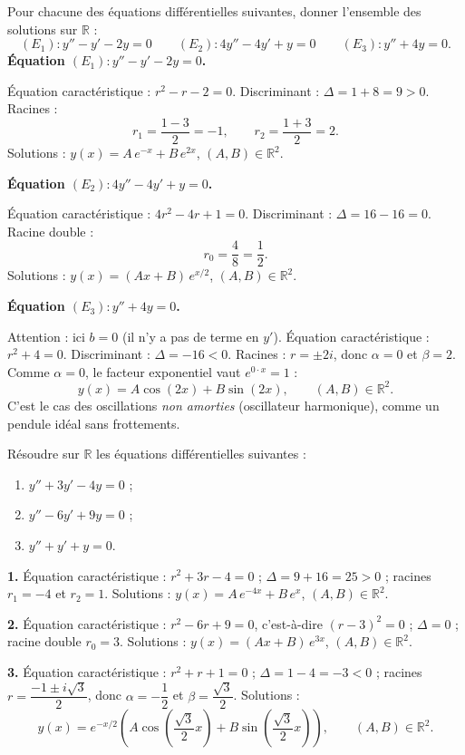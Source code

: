 \documentclass[11pt]{article}
\newcounter{popsec}
\newcounter{popsub}
\newcommand{\courssub}[1]{%
  \stepcounter{popsub}%
  \par\vspace{9pt}\noindent{\popxbold\fontsize{11.5}{13}\selectfont\color{popink}{\color{poporange}\thepopsec.\thepopsub}\hspace{6pt}#1}\par\nopagebreak\vspace{4pt}
}
\begin{document}
\courssub{Exercice résolu de synthèse}

\begin{exoresolu}
Pour chacune des équations différentielles suivantes, donner l'ensemble des solutions sur $\mathbb{R}$ :
\[ (E_1) : y'' - y' - 2y = 0 \qquad (E_2) : 4y'' - 4y' + y = 0 \qquad (E_3) : y'' + 4y = 0. \]
\tcblower
\textbf{Équation $(E_1) : y'' - y' - 2y = 0$.}

Équation caractéristique : $r^2 - r - 2 = 0$. Discriminant : $\Delta = 1 + 8 = 9 > 0$. Racines :
\[ r_1 = \frac{1 - 3}{2} = -1, \qquad r_2 = \frac{1 + 3}{2} = 2. \]
Solutions : $y(x) = A\,e^{-x} + B\,e^{2x}$, $(A,B) \in \mathbb{R}^2$.

\textbf{Équation $(E_2) : 4y'' - 4y' + y = 0$.}

Équation caractéristique : $4r^2 - 4r + 1 = 0$. Discriminant : $\Delta = 16 - 16 = 0$. Racine double :
\[ r_0 = \frac{4}{8} = \frac{1}{2}. \]
Solutions : $y(x) = (Ax + B)\,e^{x/2}$, $(A,B) \in \mathbb{R}^2$.

\textbf{Équation $(E_3) : y'' + 4y = 0$.}

Attention : ici $b = 0$ (il n'y a pas de terme en $y'$). Équation caractéristique : $r^2 + 4 = 0$. Discriminant : $\Delta = -16 < 0$. Racines : $r = \pm 2i$, donc $\alpha = 0$ et $\beta = 2$. Comme $\alpha = 0$, le facteur exponentiel vaut $e^{0 \cdot x} = 1$ :
\[ y(x) = A\cos(2x) + B\sin(2x), \qquad (A,B) \in \mathbb{R}^2. \]
C'est le cas des oscillations \emph{non amorties} (oscillateur harmonique), comme un pendule idéal sans frottements.
\end{exoresolu}

\begin{exercice}
Résoudre sur $\mathbb{R}$ les équations différentielles suivantes :
\begin{enumerate}
\item $y'' + 3y' - 4y = 0$ ;
\item $y'' - 6y' + 9y = 0$ ;
\item $y'' + y' + y = 0$.
\end{enumerate}
\end{exercice}

\begin{corrige}
\textbf{1.} Équation caractéristique : $r^2 + 3r - 4 = 0$ ; $\Delta = 9 + 16 = 25 > 0$ ; racines $r_1 = -4$ et $r_2 = 1$. Solutions : $y(x) = A\,e^{-4x} + B\,e^{x}$, $(A,B) \in \mathbb{R}^2$.

\textbf{2.} Équation caractéristique : $r^2 - 6r + 9 = 0$, c'est-à-dire $(r-3)^2 = 0$ ; $\Delta = 0$ ; racine double $r_0 = 3$. Solutions : $y(x) = (Ax + B)\,e^{3x}$, $(A,B) \in \mathbb{R}^2$.

\textbf{3.} Équation caractéristique : $r^2 + r + 1 = 0$ ; $\Delta = 1 - 4 = -3 < 0$ ; racines $r = \dfrac{-1 \pm i\sqrt{3}}{2}$, donc $\alpha = -\dfrac{1}{2}$ et $\beta = \dfrac{\sqrt{3}}{2}$. Solutions :
\[ y(x) = e^{-x/2}\left(A\cos\left(\frac{\sqrt{3}}{2}x\right) + B\sin\left(\frac{\sqrt{3}}{2}x\right)\right), \qquad (A,B) \in \mathbb{R}^2. \]
\end{corrige}
\end{document}
